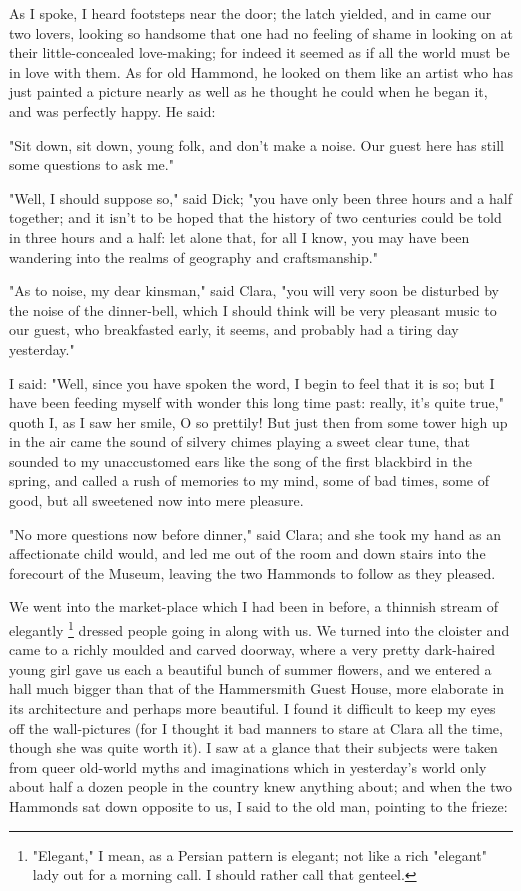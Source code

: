 As I spoke, I heard footsteps near the door; the latch yielded, and in
came our two lovers, looking so handsome that one had no feeling of
shame in looking on at their little-concealed love-making; for indeed it
seemed as if all the world must be in love with them. As for old
Hammond, he looked on them like an artist who has just painted a picture
nearly as well as he thought he could when he began it, and was
perfectly happy. He said:

"Sit down, sit down, young folk, and don't make a noise. Our guest here
has still some questions to ask me."

"Well, I should suppose so," said Dick; "you have only been three hours
and a half together; and it isn't to be hoped that the history of two
centuries could be told in three hours and a half: let alone that, for
all I know, you may have been wandering into the realms of geography and
craftsmanship."

"As to noise, my dear kinsman," said Clara, "you will very soon be
disturbed by the noise of the dinner-bell, which I should think will be
very pleasant music to our guest, who breakfasted early, it seems, and
probably had a tiring day yesterday."

I said: "Well, since you have spoken the word, I begin to feel that it
is so; but I have been feeding myself with wonder this long time past:
really, it's quite true," quoth I, as I saw her smile, O so prettily!
But just then from some tower high up in the air came the sound of
silvery chimes playing a sweet clear tune, that sounded to my
unaccustomed ears like the song of the first blackbird in the spring,
and called a rush of memories to my mind, some of bad times, some of
good, but all sweetened now into mere pleasure.

"No more questions now before dinner," said Clara; and she took my hand
as an affectionate child would, and led me out of the room and down
stairs into the forecourt of the Museum, leaving the two Hammonds to
follow as they pleased.

We went into the market-place which I had been in before, a thinnish
stream of
elegantly
\footnote{"Elegant," I mean, as a Persian pattern is elegant; not like a rich
"elegant" lady out for a morning call. I should rather call that
genteel.}
dressed people going in along with us. We turned into the cloister and
came to a richly moulded and carved doorway, where a very pretty
dark-haired young girl gave us each a beautiful bunch of summer flowers,
and we entered a hall much bigger than that of the Hammersmith Guest
House, more elaborate in its architecture and perhaps more beautiful. I
found it difficult to keep my eyes off the wall-pictures (for I thought
it bad manners to stare at Clara all the time, though she was quite
worth it). I saw at a glance that their subjects were taken from queer
old-world myths and imaginations which in yesterday's world only about
half a dozen people in the country knew anything about; and when the two
Hammonds sat down opposite to us, I said to the old man, pointing to the
frieze:

